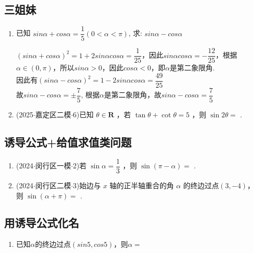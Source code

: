 \subsection*{三姐妹}
\begin{enumerate}
    \item 已知 $ sin \alpha+ cos \alpha=\dfrac{1}{5}(0<\alpha<\pi)$, 求: $ sin \alpha- cos \alpha$
    \begin{jieda}
        $(sin\alpha+cos\alpha)^2 = 1 + 2sin\alpha cos\alpha = \dfrac{1}{25}$，因此$sin\alpha cos\alpha = -\dfrac{12}{25}$，根据$\alpha \in (0, \pi)$，所以$sin\alpha > 0$，因此$cos\alpha < 0$，即$\alpha$是第二象限角. \\
        因此有$(sin\alpha - cos\alpha)^2 = 1 - 2sin\alpha cos\alpha = \dfrac{49}{25}$ \\
        故$sin\alpha - cos\alpha = \pm \dfrac{7}{5}$, 根据$\alpha$是第二象限角，故$sin\alpha - cos\alpha = \dfrac{7}{5}$
    \end{jieda}
    \item (2025$\cdot$嘉定区二模$\cdot$6)已知 $\theta  \in  \mathbf{R}$ ，若 $\tan \theta  + \cot \theta  = 5$ ，则 $\sin {2\theta } =$ .
\end{enumerate}

\subsection*{诱导公式+给值求值类问题}
\begin{enumerate}
    \item (2024$\cdot$闵行区一模$\cdot$2)若 $\sin \alpha  = \dfrac{1}{3}$ ，则 $\sin \left( {\pi  - \alpha }\right)  =$ .

    \item (2024$\cdot$闵行区二模$\cdot$3)始边与 $x$ 轴的正半轴重合的角 $\alpha$ 的终边过点$(3,-4)$，则 $\sin \left( {\alpha  + \pi }\right)  =$ .
\end{enumerate}

\subsection*{用诱导公式化名}
\begin{enumerate}
    \item 已知$\alpha$的终边过点$(sin5, cos5)$，则$\alpha = $
\end{enumerate}


